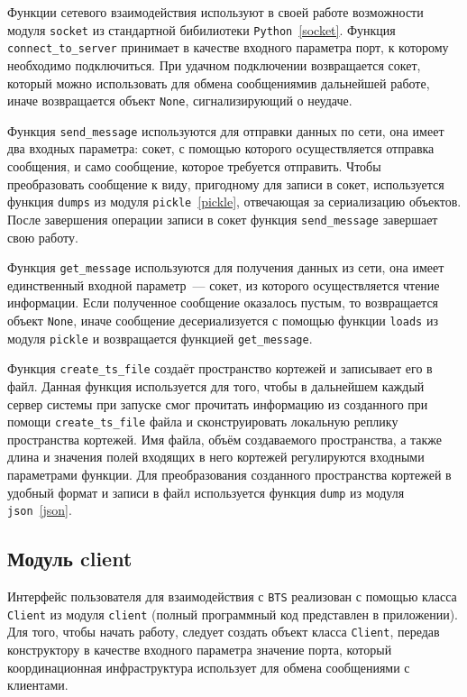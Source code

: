 Функции сетевого взаимодействия используют в своей работе возможности модуля \texttt{socket} из стандартной бибилиотеки \texttt{Python}~\ref{socket}. Функция \texttt{connect_to_server} принимает в качестве входного параметра порт, к которому необходимо подключиться. При удачном подключении возвращается сокет, который можно использовать для обмена сообщениямив дальнейшей работе, иначе возвращается объект \texttt{None}, сигнализирующий о неудаче.

Функция \texttt{send_message} используются для отправки данных по сети, она имеет два входных параметра: сокет, с помощью которого осуществляется отправка сообщения, и само сообщение, которое требуется отправить. Чтобы преобразовать сообщение к виду, пригодному для записи в сокет, используется функция \texttt{dumps} из модуля \texttt{pickle}~\ref{pickle}, отвечающая за сериализацию объектов. После завершения операции записи в сокет функция \texttt{send_message} завершает свою работу.

Функция \texttt{get_message} используются для получения данных из сети, она имеет единственный входной параметр~--- сокет, из которого осуществляется чтение информации. Если полученное сообщение оказалось пустым, то возвращается объект \texttt{None}, иначе сообщение десериализуется с помощью функции \texttt{loads} из модуля \texttt{pickle} и возвращается функцией \texttt{get_message}.

Функция \texttt{create_ts_file} создаёт пространство кортежей и записывает его в файл. Данная функция используется для того, чтобы в дальнейшем каждый сервер системы при запуске смог прочитать информацию из созданного при помощи  \texttt{create_ts_file} файла и сконструировать локальную реплику пространства кортежей. Имя файла, объём создаваемого пространства, а также длина и значения полей входящих в него кортежей регулируются входными параметрами функции. Для преобразования созданного пространства кортежей в удобный формат и записи в файл используется функция \texttt{dump} из модуля \texttt{json}~\ref{json}.


\subsection{Модуль client}\label{subsec:3}
Интерфейс пользователя для взаимодействия с \texttt{BTS} реализован с помощью класса \texttt{Client} из модуля \texttt{client} (полный программный код представлен в приложении). Для того, чтобы начать работу, следует создать объект класса \texttt{Client}, передав конструктору в качестве входного параметра значение порта, который координационная инфраструктура использует для обмена сообщениями с клиентами.

